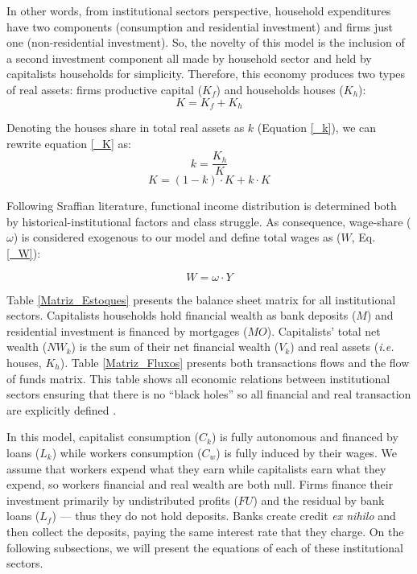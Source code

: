 \documentclass[12pt]{article}
\begin{document}
In other words, from institutional sectors perspective, household expenditures have two components (consumption and residential investment) and firms just one (non-residential investment).
So, the novelty of this model is the inclusion of a second investment component all made by household sector and held by capitalists households for simplicity. 
Therefore, this economy produces two types of real assets: firms productive capital (\(K_f\)) and households houses (\(K_h\)):
\begin{equation}
    \label{_K}
    K = K_f + K_h
\end{equation}

Denoting the houses share in total real assets as \(k\) (Equation \ref{_k}), we can rewrite equation \ref{_K} as:
\begin{equation}
\label{_k}
    k = \frac{K_h}{K}
\end{equation}
$$
K = (1-k)\cdot K + k\cdot K
$$

Following Sraffian literature, functional income distribution is determined both by historical-institutional factors and class struggle. 
As consequence, wage-share (\(\omega\)) is considered exogenous to our model and define total wages as (\(W\), Eq. \ref{_W}):

\begin{equation}
\label{_W}
    W = \omega\cdot Y
\end{equation}

Table \ref{Matriz_Estoques} presents the balance sheet matrix for all institutional sectors. 
Capitalists households hold financial wealth as bank deposits (\(M\)) and residential investment is financed by mortgages (\(MO\)).
Capitalists' total net wealth (\(NW_{k}\)) is the sum of their net financial wealth (\(V_{k}\)) and real assets (\textit{i.e.} houses, \(K_h\)).
Table  \ref{Matriz_Fluxos} presents both transactions flows and the flow of funds matrix. 
This table shows all economic relations between institutional sectors ensuring that there is no  ``black holes''
so all financial and real transaction are explicitly defined \cite{godley_monetary_2007,macedo_e_silva_peering_2011}.

In this model, capitalist consumption (\(C_k\)) is fully autonomous and financed by loans (\(L_{k}\)) while workers consumption (\(C_w\)) is fully induced by their wages.
We assume that workers expend what they earn while capitalists earn what they expend, so workers financial and real wealth are both null.
Firms finance their investment primarily by undistributed profits (\(FU\)) and the residual by bank loans (\(L_f\)) --- thus they do not hold deposits. 
Banks create credit \textit{ex nihilo} and then collect the deposits, paying the same interest rate that they charge.
On the following subsections, we will present the equations of each of these institutional sectors.
\end{document}
